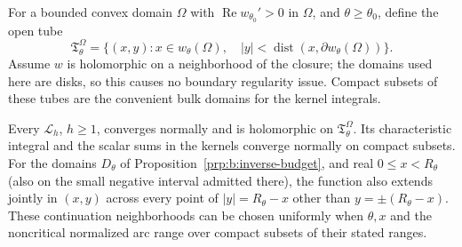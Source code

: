 For a bounded convex domain $\Omega$ with
$\operatorname{Re}w_{\theta_0}'>0$ in $\Omega$, and
$\theta\geq\theta_0$, define the open tube
\begin{equation}\label{eq:b:tube}
 \mathfrak T_\theta^\Omega
 =\{(x,y):x\in w_\theta(\Omega),\quad
       |y|<\operatorname{dist}(x,\partial w_\theta(\Omega))\}.
\end{equation}
Assume $w$ is holomorphic on a neighborhood of the closure; the
domains used here are disks, so this causes no boundary regularity
issue. Compact subsets of these tubes are the convenient bulk
domains for the kernel integrals.

\begin{prp}\label{prp:b:tube}
Every $\mathcal L_h$, $h\geq1$, converges normally and is
holomorphic on $\mathfrak T_\theta^\Omega$. Its characteristic
integral and the scalar sums in the kernels converge normally on
compact subsets. For the domains $D_\theta$ of
Proposition~\ref{prp:b:inverse-budget}, and real $0\leq x<R_\theta$
(also on the small negative interval admitted there),
the function also extends jointly in $(x,y)$ across every point of
$|y|=R_\theta-x$ other than $y=\pm(R_\theta-x)$.
These continuation neighborhoods can be chosen uniformly when
$\theta,x$ and the noncritical normalized arc range over compact
subsets of their stated ranges.
\end{prp}
